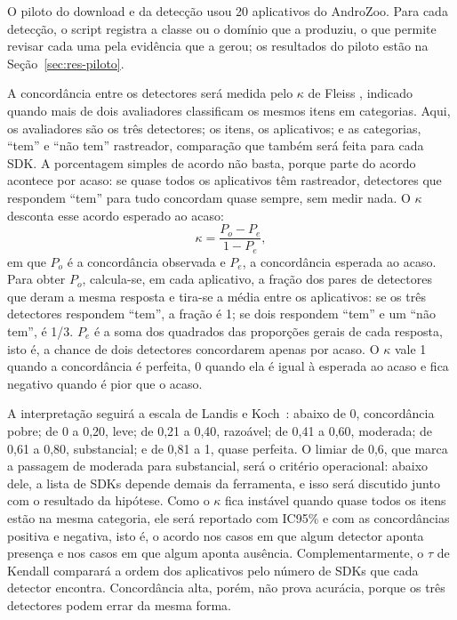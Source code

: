 O piloto do download e da detecção usou 20 aplicativos do AndroZoo. Para cada detecção, o script registra a classe ou o domínio que a produziu, o que permite revisar cada uma pela evidência que a gerou; os resultados do piloto estão na Seção~\ref{sec:res-piloto}.

A concordância entre os detectores será medida pelo $\kappa$ de Fleiss \cite{fleiss1971}, indicado quando mais de dois avaliadores classificam os mesmos itens em categorias. Aqui, os avaliadores são os três detectores; os itens, os aplicativos; e as categorias, ``tem'' e ``não tem'' rastreador, comparação que também será feita para cada SDK. A porcentagem simples de acordo não basta, porque parte do acordo acontece por acaso: se quase todos os aplicativos têm rastreador, detectores que respondem ``tem'' para tudo concordam quase sempre, sem medir nada. O $\kappa$ desconta esse acordo esperado ao acaso:
\[
\kappa = \frac{P_o - P_e}{1 - P_e},
\]
em que $P_o$ é a concordância observada e $P_e$, a concordância esperada ao acaso. Para obter $P_o$, calcula-se, em cada aplicativo, a fração dos pares de detectores que deram a mesma resposta e tira-se a média entre os aplicativos: se os três detectores respondem ``tem'', a fração é 1; se dois respondem ``tem'' e um ``não tem'', é 1/3. $P_e$ é a soma dos quadrados das proporções gerais de cada resposta, isto é, a chance de dois detectores concordarem apenas por acaso. O $\kappa$ vale 1 quando a concordância é perfeita, 0 quando ela é igual à esperada ao acaso e fica negativo quando é pior que o acaso.

A interpretação seguirá a escala de Landis e Koch~\cite{landis1977}: abaixo de 0, concordância pobre; de 0 a 0,20, leve; de 0,21 a 0,40, razoável; de 0,41 a 0,60, moderada; de 0,61 a 0,80, substancial; e de 0,81 a 1, quase perfeita. O limiar de 0,6, que marca a passagem de moderada para substancial, será o critério operacional: abaixo dele, a lista de SDKs depende demais da ferramenta, e isso será discutido junto com o resultado da hipótese. Como o $\kappa$ fica instável quando quase todos os itens estão na mesma categoria, ele será reportado com IC95\% e com as concordâncias positiva e negativa, isto é, o acordo nos casos em que algum detector aponta presença e nos casos em que algum aponta ausência. Complementarmente, o $\tau$ de Kendall \cite{kendall1938} comparará a ordem dos aplicativos pelo número de SDKs que cada detector encontra. Concordância alta, porém, não prova acurácia, porque os três detectores podem errar da mesma forma.

